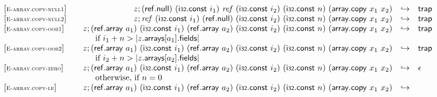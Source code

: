 $$\begin{array}[t]{@{}lrcl@{}l@{}}
{\begin{array}[t]{@{}l@{}l@{}}
\end{array}
} \\
{[\textsc{\scriptsize E{-}array.copy{-}null1}]} \quad & z ; (\mathsf{ref{.}null})~(\mathsf{i{\scriptstyle 32}}{.}\mathsf{const}~i_1)~{\mathit{ref}}~(\mathsf{i{\scriptstyle 32}}{.}\mathsf{const}~i_2)~(\mathsf{i{\scriptstyle 32}}{.}\mathsf{const}~n)~(\mathsf{array{.}copy}~x_1~x_2) & \hookrightarrow & \mathsf{trap} \\
{[\textsc{\scriptsize E{-}array.copy{-}null2}]} \quad & z ; {\mathit{ref}}~(\mathsf{i{\scriptstyle 32}}{.}\mathsf{const}~i_1)~(\mathsf{ref{.}null})~(\mathsf{i{\scriptstyle 32}}{.}\mathsf{const}~i_2)~(\mathsf{i{\scriptstyle 32}}{.}\mathsf{const}~n)~(\mathsf{array{.}copy}~x_1~x_2) & \hookrightarrow & \mathsf{trap} \\
{[\textsc{\scriptsize E{-}array.copy{-}oob1}]} \quad & z ; (\mathsf{ref{.}array}~a_1)~(\mathsf{i{\scriptstyle 32}}{.}\mathsf{const}~i_1)~(\mathsf{ref{.}array}~a_2)~(\mathsf{i{\scriptstyle 32}}{.}\mathsf{const}~i_2)~(\mathsf{i{\scriptstyle 32}}{.}\mathsf{const}~n)~(\mathsf{array{.}copy}~x_1~x_2) & \hookrightarrow & \mathsf{trap} &  \\
& \multicolumn{4}{@{}l@{}}{\quad
\quad \mbox{if}~ i_1 + n > {|z{.}\mathsf{arrays}{}[a_1]{.}\mathsf{fields}|}
} \\
{[\textsc{\scriptsize E{-}array.copy{-}oob2}]} \quad & z ; (\mathsf{ref{.}array}~a_1)~(\mathsf{i{\scriptstyle 32}}{.}\mathsf{const}~i_1)~(\mathsf{ref{.}array}~a_2)~(\mathsf{i{\scriptstyle 32}}{.}\mathsf{const}~i_2)~(\mathsf{i{\scriptstyle 32}}{.}\mathsf{const}~n)~(\mathsf{array{.}copy}~x_1~x_2) & \hookrightarrow & \mathsf{trap} &  \\
& \multicolumn{4}{@{}l@{}}{\quad
\quad \mbox{if}~ i_2 + n > {|z{.}\mathsf{arrays}{}[a_2]{.}\mathsf{fields}|}
} \\
{[\textsc{\scriptsize E{-}array.copy{-}zero}]} \quad & z ; (\mathsf{ref{.}array}~a_1)~(\mathsf{i{\scriptstyle 32}}{.}\mathsf{const}~i_1)~(\mathsf{ref{.}array}~a_2)~(\mathsf{i{\scriptstyle 32}}{.}\mathsf{const}~i_2)~(\mathsf{i{\scriptstyle 32}}{.}\mathsf{const}~n)~(\mathsf{array{.}copy}~x_1~x_2) & \hookrightarrow & \epsilon &  \\
& \multicolumn{4}{@{}l@{}}{\quad
\quad \mbox{otherwise, if}~ n = 0
} \\
{[\textsc{\scriptsize E{-}array.copy{-}le}]} \quad & z ; (\mathsf{ref{.}array}~a_1)~(\mathsf{i{\scriptstyle 32}}{.}\mathsf{const}~i_1)~(\mathsf{ref{.}array}~a_2)~(\mathsf{i{\scriptstyle 32}}{.}\mathsf{const}~i_2)~(\mathsf{i{\scriptstyle 32}}{.}\mathsf{const}~n)~(\mathsf{array{.}copy}~x_1~x_2) & \hookrightarrow & & \\

\end{array}$$
